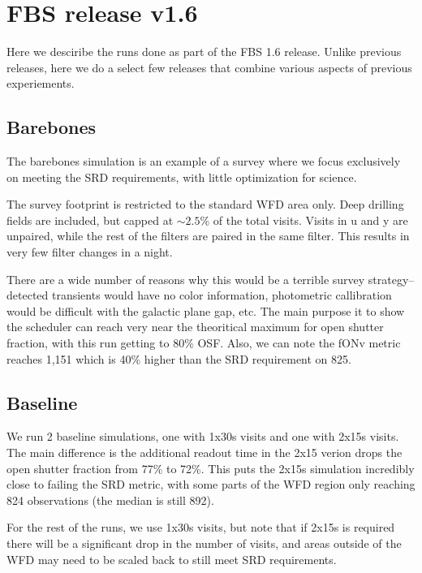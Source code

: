 
\section{FBS release v1.6}

Here we desciribe the runs done as part of the FBS 1.6 release.  Unlike previous releases, here we do a select few releases that combine various aspects of previous experiements.



\subsection{Barebones}

The barebones simulation is an example of a survey where we focus exclusively on meeting the SRD requirements, with little optimization for science.

The survey footprint is restricted to the standard WFD area only. Deep drilling fields are included, but capped at $\sim2.5$\% of the total visits. Visits in u and y are unpaired, while the rest of the filters are paired in the same filter. This results in very few filter changes in a night.

There are a wide number of reasons why this would be a terrible survey strategy--detected transients would have no color information, photometric callibration would be difficult with the galactic plane gap, etc.  The main purpose it to show the scheduler can reach very near the theoritical maximum for open shutter fraction, with this run getting to 80\% OSF. Also, we can note the fONv metric reaches 1,151 which is 40\% higher than the SRD requirement on 825.


\subsection{Baseline}

We run 2 baseline simulations, one with 1x30s visits and one with 2x15s visits.  The main difference is the additional readout time in the 2x15 verion drops the open shutter fraction from 77\% to 72\%. This puts the 2x15s simulation incredibly close to failing the SRD metric, with some parts of the WFD region only reaching 824 observations (the median is still 892). 

For the rest of the runs, we use 1x30s visits, but note that if 2x15s is required there will be a significant drop in the number of visits, and areas outside of the WFD may need to be scaled back to still meet SRD requirements.

